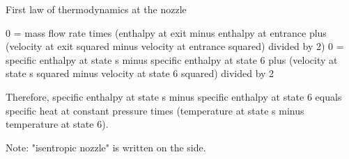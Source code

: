 First law of thermodynamics at the nozzle

0 = mass flow rate times (enthalpy at exit minus enthalpy at entrance plus (velocity at exit squared minus velocity at entrance squared) divided by 2)  
0 = specific enthalpy at state s minus specific enthalpy at state 6 plus (velocity at state s squared minus velocity at state 6 squared) divided by 2  

Therefore, specific enthalpy at state s minus specific enthalpy at state 6 equals specific heat at constant pressure times (temperature at state s minus temperature at state 6).  

Note: "isentropic nozzle" is written on the side.